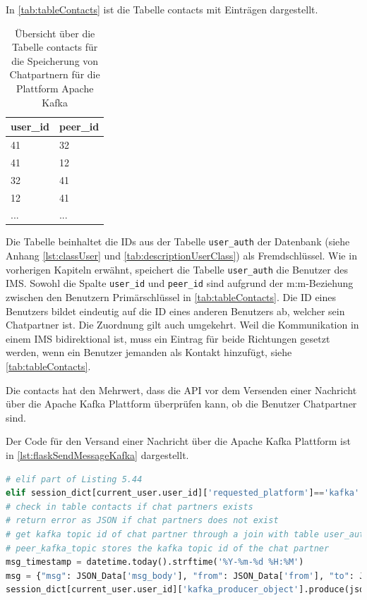 \documentclass[a4paper,titlepage,halfparskip,12pt]{scrreprt}
\begin{document}
\begin{onehalfspacing}
In \autoref{tab:tableContacts} ist die Tabelle contacts mit Einträgen dargestellt.

\begin{table}[h]
\centering
\caption{Übersicht über die Tabelle contacts für die Speicherung von Chatpartnern für die Plattform Apache Kafka}
\begin{tabular}{|l|l|}
\hline
\textbf{user\_id} &  \textbf{peer\_id} \\
\hline
41 & 32 \\
\hline
41 & 12 \\
\hline
32 & 41 \\
\hline
12 & 41 \\
\hline
... & ... \\
\hline
\end{tabular}
\label{tab:tableContacts}
\end{table}

Die Tabelle beinhaltet die IDs aus der Tabelle \texttt{user\_auth} der Datenbank (siehe Anhang \autoref{lst:classUser} und \autoref{tab:descriptionUserClass}) als Fremdschlüssel. Wie in vorherigen Kapiteln erwähnt, speichert die Tabelle \texttt{user\_auth} die Benutzer des \acs{IMS}. Sowohl die Spalte \texttt{user\_id} und \texttt{peer\_id} sind aufgrund der m:m-Beziehung zwischen den Benutzern Primärschlüssel in \autoref{tab:tableContacts}. Die ID eines Benutzers bildet eindeutig auf die ID eines anderen Benutzers ab, welcher sein Chatpartner ist. Die Zuordnung gilt auch umgekehrt. Weil die Kommunikation in einem \acs{IMS} bidirektional ist, muss ein Eintrag für beide Richtungen gesetzt werden, wenn ein Benutzer jemanden als Kontakt hinzufügt, siehe \autoref{tab:tableContacts}.

Die contacts hat den Mehrwert, dass die \acs{API} vor dem Versenden einer Nachricht über die Apache Kafka Plattform überprüfen kann, ob die Benutzer Chatpartner sind.

Der Code für den Versand einer Nachricht über die Apache Kafka Plattform ist in \autoref{lst:flaskSendMessageKafka} dargestellt.

\begin{lstlisting}[language=python, caption={Code für den Versand einer Nachricht über die \acs{API} an Apache Kafka}, label={lst:flaskSendMessageKafka}]
# elif part of Listing 5.44
elif session_dict[current_user.user_id]['requested_platform']=='kafka':
# check in table contacts if chat partners exists
# return error as JSON if chat partners does not exist
# get kafka topic id of chat partner through a join with table user_auth
# peer_kafka_topic stores the kafka topic id of the chat partner
msg_timestamp = datetime.today().strftime('%Y-%m-%d %H:%M')
msg = {"msg": JSON_Data['msg_body'], "from": JSON_Data['from'], "to": JSON_Data['to'], "timestamp": msg_timestamp, "type": "chat"}
session_dict[current_user.user_id]['kafka_producer_object'].produce(json.dumps(msg).encode())


\end{lstlisting}
\end{onehalfspacing}
\end{document}
